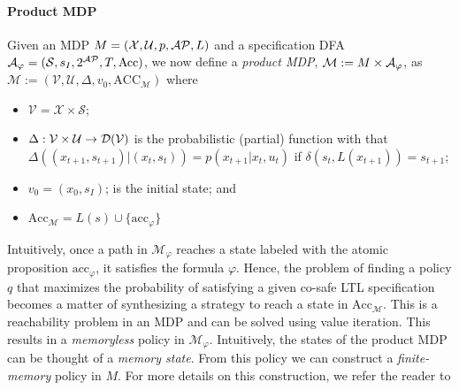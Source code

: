 \paragraph*{Product MDP}
Given an MDP $M=(\mathcal{X},\mathcal{U},p,\mathcal{AP},L)$ and a specification DFA
$\mathcal{A}_{\varphi} = (\mathcal{S},s_I,2^{\mathcal{AP}}, T,\textrm{Acc})$, we now define a \emph{product
MDP}, $\mathcal{M} := M \times\mathcal{A}_{\varphi}$, as $\mathcal{M}
:= (\mathcal{V},\mathcal{U}, \Delta,v_0,\textrm{ACC}_{\mathcal{M}})$ where
\begin{itemize}
	\item $\mathcal{V} = \mathcal{X} \times \mathcal{S}$;
	\item $\Delta: \mathcal{V} \times \mathcal{U} \rightarrow \mathcal{D}(\mathcal{V})$ is the probabilistic
		(partial) function with
		that $\Delta\left((x_{t+1},s_{t+1})\vert (x_t,s_t)\right) = p(x_{t+1} \vert x_t,u_t ) $ if $\delta(s_t,L(x_{t+1}))
		= s_{t+1}$;
	\item $v_0 = (x_0,s_I)$; is the initial state; and
	\item $\textrm{Acc}_{\mathcal{M}} = L(s) \cup \{\textrm{acc}_\varphi\}$
\end{itemize}
Intuitively, once a path in $\mathcal{M}_{\varphi}$ reaches a state labeled with the atomic proposition $\textrm{acc}_\varphi$, it satisfies the formula $\varphi$.  Hence, the problem of finding a policy $q$ that maximizes the probability of satisfying a given co-safe LTL specification becomes a matter of synthesizing a strategy to reach a state in $\textrm{Acc}_{\mathcal{M}}$. This is a reachability problem in an MDP and can be solved using value iteration. This results in a \emph{memoryless} policy in $\mathcal{M}_\varphi$. Intuitively, the states of the product MDP can be thought of a \emph{memory state}. From this policy we can construct a \emph{finite-memory} policy in $M$. For more details on this construction, we refer the reader to  \cite{forejt2011automated}


